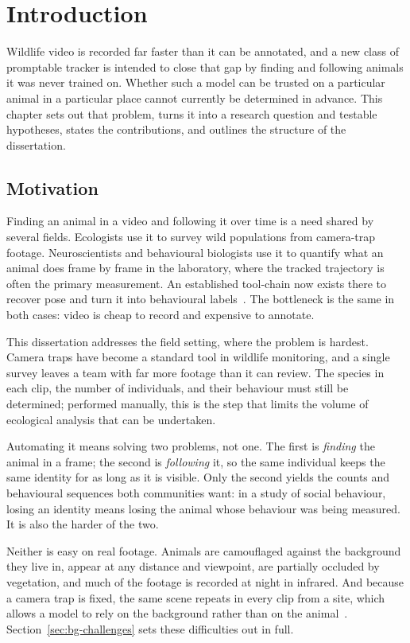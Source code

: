 \chapter{Introduction}
\label{ch:introduction}

Wildlife video is recorded far faster than it can be annotated, and a new class of promptable tracker is
intended to close that gap by finding and following animals it was never trained on. Whether such a model
can be trusted on a particular animal in a particular place cannot currently be determined in advance. This
chapter sets out that problem, turns it into a research question and testable hypotheses, states the
contributions, and outlines the structure of the dissertation.

\section{Motivation}
\label{sec:motivation}
Finding an animal in a video and following it over time is a need shared by several fields. Ecologists use it
to survey wild populations from camera-trap footage. Neuroscientists and behavioural biologists use it to
quantify what an animal does frame by frame in the laboratory, where the tracked trajectory is often the
primary measurement. An established tool-chain now exists there to recover pose and turn it into
behavioural labels~\cite{deeplabcut,sleap,poser}. The bottleneck is the same in both cases: video is cheap to
record and expensive to annotate.

This dissertation addresses the field setting, where the problem is hardest. Camera traps have become a
standard tool in wildlife monitoring, and a single survey leaves a team with far more footage than it can
review. The species in each clip, the number of individuals, and their behaviour must still be determined;
performed manually, this is the step that limits the volume of ecological analysis that can be undertaken.

Automating it means solving two problems, not one. The first is \emph{finding} the animal in a frame; the
second is \emph{following} it, so the same individual keeps the same identity for as long as it is
visible. Only the second yields the counts and behavioural sequences both communities want: in a
study of social behaviour, losing an identity means losing the animal whose behaviour was being
measured. It is also the harder of the two.

Neither is easy on real footage. Animals are camouflaged against the background they live in, appear at any
distance and viewpoint, are partially occluded by vegetation, and much of the footage is recorded at night in
infrared. And because a camera trap is fixed, the same scene repeats in every clip from a site, which allows
a model to rely on the background rather than on the animal~\cite{panaf,xiao}.
Section~\ref{sec:bg-challenges} sets these difficulties out in full.

